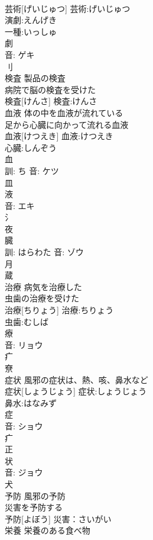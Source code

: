 \documentclass[8pt]{extreport}
\begin{document}
\begin{CJK}{UTF8}{min}
\\	芸術[げいじゅつ]			芸術:げいじゅつ
\\	演劇:えんげき
\\	一種:いっしゅ
\\	劇 
\\	音: ゲキ 
\\	刂 
\\	検査	製品の検査 
\\	病院で脳の検査を受けた 
\\	検査[けんさ]			検査:けんさ
\\	血液	体の中を血液が流れている 
\\	足から心臓に向かって流れる血液 
\\	血液[けつえき]			血液:けつえき
\\	心臓:しんぞう
\\	血 
\\	訓: ち 音: ケツ 
\\	皿 
\\	液 
\\	音: エキ 
\\	氵 
\\	夜 
\\	臓 
\\	訓: はらわた 音: ゾウ 
\\	月 
\\	蔵 
\\	治療	病気を治療した 
\\	虫歯の治療を受けた 
\\	治療[ちりょう]			治療:ちりょう
\\	虫歯:むしば
\\	療 
\\	音: リョウ 
\\	疒 
\\	尞	
\\	症状	風邪の症状は、熱、咳、鼻水など 
\\	症状[しょうじょう]			症状:しょうじょう
\\	鼻水:はなみず
\\	症 
\\	音: ショウ 
\\	疒 
\\	正 
\\	状 
\\	音: ジョウ 
\\	犬 
\\	予防	風邪の予防 
\\	災害を予防する 
\\	予防[よぼう]			災害：さいがい
\\	栄養	栄養のある食べ物 

\end{CJK}
\end{document}
